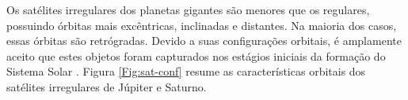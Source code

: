 \documentclass[12pt,a4paper]{report}
\begin{document}
Os satélites irregulares dos planetas gigantes são menores que os regulares, possuindo órbitas mais excêntricas, inclinadas e distantes. Na maioria dos casos, essas órbitas são retrógradas. Devido a suas configurações orbitais, é amplamente aceito que estes objetos foram capturados nos estágios iniciais da formação do Sistema Solar \citep{Sheppard2003}. Figura \ref{Fig:sat-conf} resume as características orbitais dos satélites irregulares de Júpiter e Saturno.

\begin{figure}[h]
\begin{centering}

\end{centering}
\end{figure}
\end{document}
